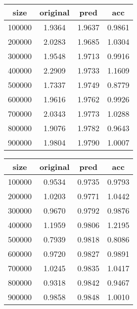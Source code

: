 \documentclass[12pt]{article}
\begin{document}
\begin{minipage}{0.5\textwidth}
    \begin{tabular}{|c|c|c|c|}
        \hline size & original & pred & acc \\
        \hline 100000 & 1.9364 & 1.9637 & 0.9861 \\
        \hline 200000 & 2.0283 & 1.9685 & 1.0304 \\
        \hline 300000 & 1.9548 & 1.9713 & 0.9916 \\
        \hline 400000 & 2.2909 & 1.9733 & 1.1609 \\
        \hline 500000 & 1.7337 & 1.9749 & 0.8779 \\
        \hline 600000 & 1.9616 & 1.9762 & 0.9926 \\
        \hline 700000 & 2.0343 & 1.9773 & 1.0288 \\
        \hline 800000 & 1.9076 & 1.9782 & 0.9643 \\
        \hline 900000 & 1.9804 & 1.9790 & 1.0007 \\
        \hline
    \end{tabular}
\end{minipage}
\begin{minipage}{0.5\textwidth}
    \begin{tabular}{|c|c|c|c|}
        \hline size & original & pred & acc \\
        \hline 100000 & 0.9534 & 0.9735 & 0.9793 \\
        \hline 200000 & 1.0203 & 0.9771 & 1.0442 \\
        \hline 300000 & 0.9670 & 0.9792 & 0.9876 \\
        \hline 400000 & 1.1959 & 0.9806 & 1.2195 \\
        \hline 500000 & 0.7939 & 0.9818 & 0.8086 \\
        \hline 600000 & 0.9720 & 0.9827 & 0.9891 \\
        \hline 700000 & 1.0245 & 0.9835 & 1.0417 \\
        \hline 800000 & 0.9318 & 0.9842 & 0.9467 \\
        \hline 900000 & 0.9858 & 0.9848 & 1.0010 \\
        \hline
    \end{tabular}
\end{minipage}
\end{document}
